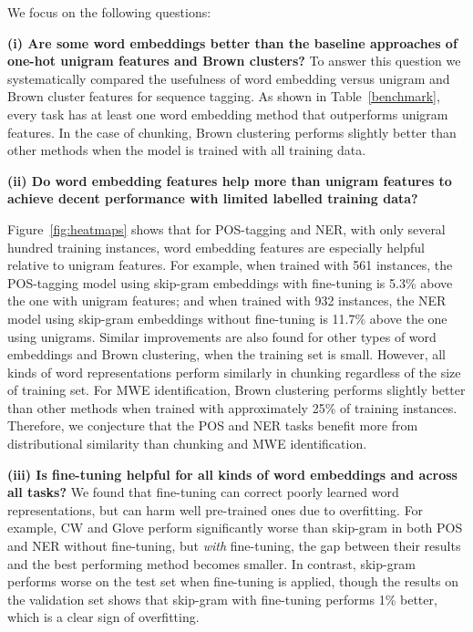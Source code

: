 We focus on the following questions:

\textbf{(i) Are some word embeddings better than the baseline approaches of one-hot unigram features and Brown clusters?}
To answer this question we systematically compared the usefulness of word embedding versus
unigram and Brown cluster features for sequence tagging.
As shown in Table~\ref{benchmark}, every task has at least one word embedding method that outperforms
unigram features. In the case of chunking, Brown clustering performs slightly better than other methods  when the model is trained with all training data. 

\textbf{(ii) Do word embedding features help more than unigram features to achieve decent performance with limited labelled training data?}

Figure~\ref{fig:heatmaps} shows that for POS-tagging and NER, with only several hundred training instances, 
word embedding features are especially helpful relative to unigram features. 
For example, when trained with 561 instances, the POS-tagging model using skip-gram embeddings with fine-tuning is 5.3\% above
the one with unigram features; and when trained with 932 instances, the NER model using skip-gram embeddings without fine-tuning is 11.7\% above the one using unigrams. 
Similar improvements are also found for other types of word embeddings and Brown clustering, when the training set is small. 
However, all kinds of word representations perform similarly in chunking regardless of the size of training set. 
For MWE identification, Brown clustering performs slightly better than other methods when trained with approximately 25\% of training instances. Therefore, we conjecture that the POS and NER tasks benefit more from distributional similarity than chunking and MWE identification.

\textbf{(iii) Is fine-tuning helpful for all kinds of word embeddings and across all tasks?}
We found that fine-tuning can correct poorly learned word representations, but can harm well pre-trained ones due to overfitting. For example, CW and Glove perform significantly worse than skip-gram in both POS and NER without fine-tuning, but \emph{with} fine-tuning, the gap between their results and the best performing method becomes smaller. In contrast, skip-gram performs worse on the test set when fine-tuning is applied, though the results on the validation set shows that skip-gram with fine-tuning performs 1\% better, which is a clear sign of overfitting.


